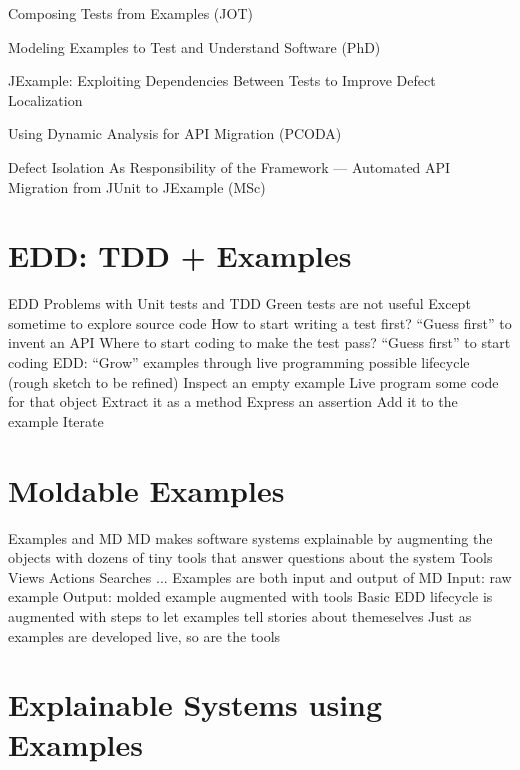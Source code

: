 \documentclass[sigplan,anonymous,review,10pt]{acmart}
\begin{document}
Composing Tests from Examples (JOT)
\cite{Gael07a}

Modeling Examples to Test and Understand Software (PhD)
\cite{Gael06b}

JExample: Exploiting Dependencies Between Tests to Improve Defect Localization
\cite{Kuhn08a}

Using Dynamic Analysis for API Migration (PCODA)
\cite{Haen08b}

Defect Isolation As Responsibility of the Framework --- Automated API Migration from JUnit to JExample (MSc)
\cite{Haen09a}



\section{EDD: TDD + Examples}\label{sec:edd}

	EDD
		Problems with Unit tests and TDD
			Green tests are not useful
				Except sometime to explore source code
			How to start writing a test first?
				“Guess first” to invent an API
			Where to start coding to make the test pass?
				“Guess first” to start coding
		EDD: “Grow” examples through live programming
			possible lifecycle (rough sketch to be refined)
				Inspect an empty example
				Live program some code for that object
				Extract it as a method
				Express an assertion
				Add it to the example
				Iterate


\section{Moldable Examples}\label{sec:moldable}

	Examples and MD
		MD makes software systems explainable by augmenting the objects with dozens of tiny tools that answer questions about the system
			Tools
				Views
				Actions
				Searches
				...
		Examples are both input and output of MD
			Input: raw example
			Output: molded example augmented with tools
		Basic EDD lifecycle is augmented with steps to let examples tell stories about themeselves
		Just as examples are developed live, so are the tools

\section{Explainable Systems using Examples}\label{sec:explainable}
\end{document}
